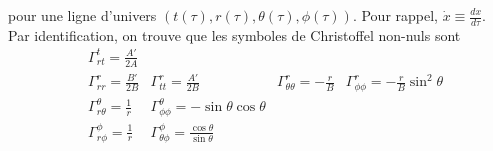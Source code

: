 \documentclass[a4paper,11pt]{report}
\begin{document}
        pour une ligne d'univers $(t(\tau),r(\tau),\theta(\tau),\phi(\tau))$. Pour rappel, $\dot{x}\equiv\frac{dx}{d\tau}$. Par identification, on trouve que les symboles de Christoffel non-nuls sont
        \begin{align}
            &\Gamma^t_{rt} = \frac{A'}{2A} & & & \\
            &\Gamma^r_{rr} = \frac{B'}{2B} &\Gamma^r_{tt} = \frac{A'}{2B} &\Gamma^r_{\theta\theta} = -\frac{r}{B} &\Gamma^r_{\phi\phi} = -\frac{r}{B}\sin^2\theta\\
            &\Gamma^\theta_{r\theta} = \frac{1}{r} &\Gamma^\theta_{\phi\phi} = -\sin\theta\cos\theta & & \\
            &\Gamma^\phi_{r\phi} = \frac{1}{r} &\Gamma^\phi_{\theta\phi} = \frac{\cos\theta}{\sin\theta} & &
        \end{align}
        
\end{document}

